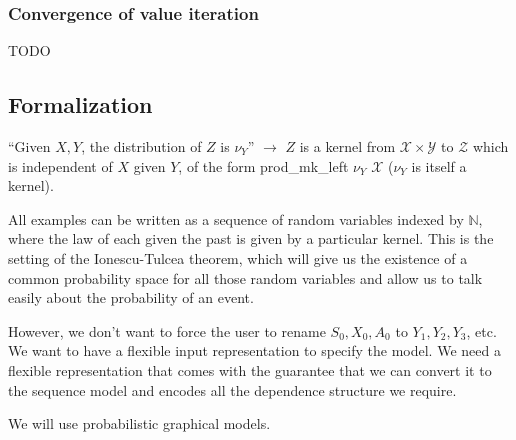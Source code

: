 \subsubsection{Convergence of value iteration}
\label{ssub:convergence_of_value_iteration}

TODO

\subsection{Formalization}

``Given $X, Y$, the distribution of $Z$ is $\nu_Y$'' $\to$ $Z$ is a kernel from $\mathcal X \times \mathcal Y$ to $\mathcal Z$ which is independent of $X$ given $Y$, of the form prod_mk_left $\nu_Y$ $\mathcal X$ ($\nu_Y$ is itself a kernel).

All examples can be written as a sequence of random variables indexed by $\mathbb{N}$, where the law of each given the past is given by a particular kernel. This is the setting of the Ionescu-Tulcea theorem, which will give us the existence of a common probability space for all those random variables and allow us to talk easily about the probability of an event. 

However, we don't want to force the user to rename $S_0, X_0, A_0$ to $Y_1, Y_2, Y_3$, etc. We want to have a flexible input representation to specify the model. We need a flexible representation that comes with the guarantee that we can convert it to the sequence model and encodes all the dependence structure we require.

We will use probabilistic graphical models.


